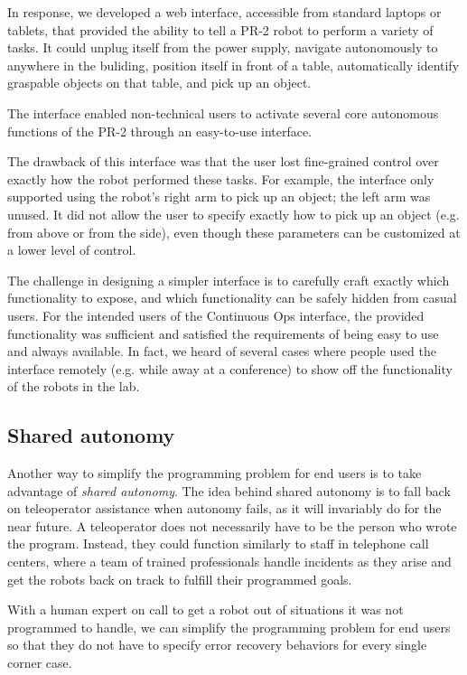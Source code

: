 \documentclass[10pt,twocolumn]{article}
\begin{document}
In response, we developed a web interface, accessible from standard laptops or tablets, that provided the ability to tell a PR-2 robot to perform a variety of tasks.  It could unplug itself from the power supply, navigate autonomously to anywhere in the buliding, position itself in front of a table, automatically identify graspable objects on that table, and pick up an object.
\begin{changebar}
The interface enabled non-technical users to activate several core autonomous functions of the PR-2 through an easy-to-use interface.

The drawback of this interface was that the user lost fine-grained control over exactly how the robot performed these tasks. For example, the interface only supported using the robot's right arm to pick up an object; the left arm was unused. It did not allow the user to specify exactly how to pick up an object (e.g. from above or from the side), even though these parameters can be customized at a lower level of control. 

The challenge in designing a simpler interface is to carefully craft exactly which functionality to expose, and which functionality can be safely hidden from casual users.  For the intended users of the Continuous Ops interface, the provided functionality was sufficient and satisfied the requirements of being easy to use and always available. In fact, we heard of several cases where people used the interface remotely (e.g. while away at a conference) to show off the functionality of the robots in the lab.

\subsection{Shared autonomy}

Another way to simplify the programming problem for end users is to take advantage of {\em shared autonomy}. The idea behind shared autonomy is to fall back on teleoperator assistance when autonomy fails, as it will invariably do for the near future. A teleoperator does not necessarily have to be the person who wrote the program. Instead, they could function similarly to staff in telephone call centers, where a team of trained professionals handle incidents as they arise and get the robots back on track to fulfill their programmed goals.

With a human expert on call to get a robot out of situations it was not programmed to handle, we can simplify the programming problem for end users so that they do not have to specify error recovery behaviors for every single corner case.
\end{changebar}
\end{document}
